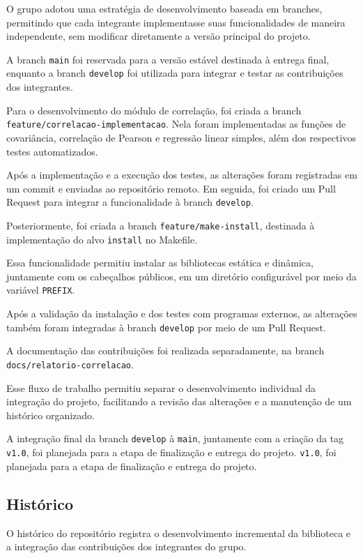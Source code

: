 \documentclass[12pt,a4paper]{article}
\newcommand{\cod}[1]{\texttt{#1}}
\begin{document}
O grupo adotou uma estratégia de desenvolvimento
baseada em branches, permitindo que cada integrante
implementasse suas funcionalidades de maneira
independente, sem modificar diretamente a versão
principal do projeto.

A branch \cod{main} foi reservada para a versão
estável destinada à entrega final, enquanto a branch
\cod{develop} foi utilizada para integrar e testar
as contribuições dos integrantes.

Para o desenvolvimento do módulo de correlação,
foi criada a branch
\cod{feature/correlacao-implementacao}.
Nela foram implementadas as funções de covariância,
correlação de Pearson e regressão linear simples,
além dos respectivos testes automatizados.

Após a implementação e a execução dos testes,
as alterações foram registradas em um commit e
enviadas ao repositório remoto. Em seguida,
foi criado um Pull Request para integrar a
funcionalidade à branch \cod{develop}.

Posteriormente, foi criada a branch
\cod{feature/make-install}, destinada à implementação
do alvo \cod{install} no Makefile.

Essa funcionalidade permitiu instalar as bibliotecas
estática e dinâmica, juntamente com os cabeçalhos
públicos, em um diretório configurável por meio
da variável \cod{PREFIX}.

Após a validação da instalação e dos testes com
programas externos, as alterações também foram
integradas à branch \cod{develop} por meio de
um Pull Request.

A documentação das contribuições foi realizada
separadamente, na branch
\cod{docs/relatorio-correlacao}.

Esse fluxo de trabalho permitiu separar o
desenvolvimento individual da integração do projeto,
facilitando a revisão das alterações e a manutenção
de um histórico organizado.

A integração final da branch \cod{develop} à
\cod{main}, juntamente com a criação da tag
\cod{v1.0}, foi planejada para a etapa de
finalização e entrega do projeto.
\cod{v1.0}, foi planejada para a etapa de
finalização e entrega do projeto.

\subsection{Histórico}

O histórico do repositório registra o desenvolvimento
incremental da biblioteca e a integração das
contribuições dos integrantes do grupo.
\end{document}
